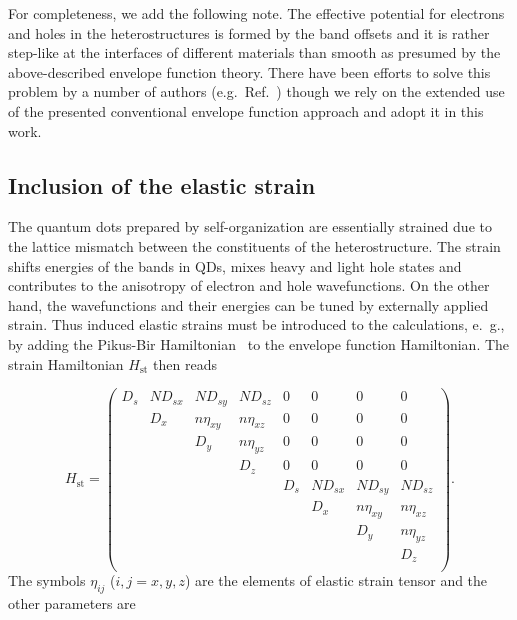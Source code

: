 For completeness, we add the following note. The effective potential for electrons and holes in the heterostructures is formed by the band offsets and it is rather step-like at the interfaces of different materials than smooth as presumed by the above-described envelope function theory. There have been efforts to solve this problem by a number of authors (e.g.~Ref.~\citep{MlinarEnvelope}) though we rely on the extended use of the presented conventional envelope function approach and adopt it in this work. 

\subsection{Inclusion of the elastic strain}

The quantum dots prepared by self-organization are essentially strained due to the lattice mismatch between the constituents of the heterostructure. The strain shifts energies of the bands in QDs, mixes heavy and light hole states and contributes to the anisotropy of electron and hole wavefunctions. On the other hand, the wavefunctions and their energies can be tuned by externally applied strain. Thus induced elastic strains must be introduced to the calculations, e.~g., by adding the Pikus-Bir Hamiltonian~\citep{BirPik} to the envelope function Hamiltonian. The strain Hamiltonian $H_\mathrm{st}$ then reads

\begin{equation}
H_\mathrm{st}=
\begin{pmatrix}
D_s& ND_{sx}& ND_{sy}& ND_{sz}& 0& 0& 0& 0\\
& D_x& n\eta_{xy}& n\eta_{xz}& 0& 0& 0& 0\\
& & D_y& n\eta_{yz}& 0& 0& 0& 0\\
& & & D_z& 0& 0& 0& 0\\
& & & & D_s& ND_{sx}& ND_{sy}& ND_{sz}\\
& & & & & D_x& n\eta_{xy}& n\eta_{xz}\\
& & & & & & D_y& n\eta_{yz}\\
& & & & & & & D_z\\\end{pmatrix}.
\end{equation}
The symbols $\eta_{ij}$ ($i,j=x,y,z$) are the elements of elastic strain tensor and the other parameters are

